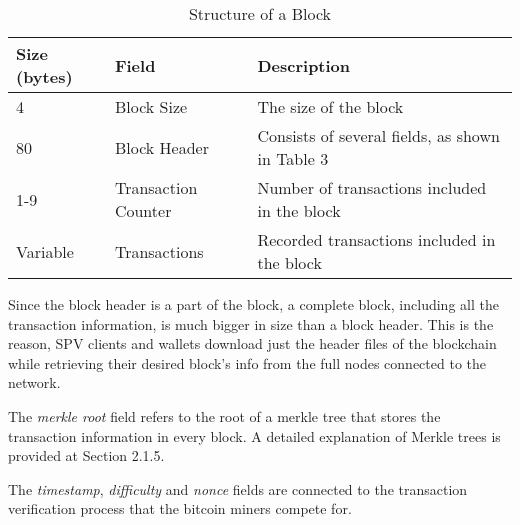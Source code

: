 \documentclass[english]{tktltiki}
\begin{document}
\begin{table}[h]
\centering
\label{structure-of-a-block}
\begin{tabular}{|l|l|l|}
\hline
\textbf{Size (bytes)} & \textbf{Field}      & \textbf{Description}                          \\ \hline
4                     & Block Size          & The size of the block                         \\ \hline
80                    & Block Header        & Consists of several fields, as shown in Table 3 \\ \hline
1-9                   & Transaction Counter & Number of transactions included in the block  \\ \hline
Variable              & Transactions        & Recorded transactions included in the block   \\ \hline
\end{tabular}
\caption{Structure of a Block}
\end{table}
 
Since the block header is a part of the block, a complete block, including all the transaction information, is much bigger in size than a block header. This is the reason, SPV clients and wallets download just the header files of the blockchain while retrieving their desired block's info from the full nodes connected to the network. 

The \textit{merkle root} field refers to the root of a merkle tree that stores the transaction information in every block. A detailed explanation of Merkle trees is provided at Section 2.1.5.

The \textit{timestamp}, \textit{difficulty} and \textit{nonce} fields are connected to the transaction verification process that the bitcoin miners compete for. \newline
\end{document}
